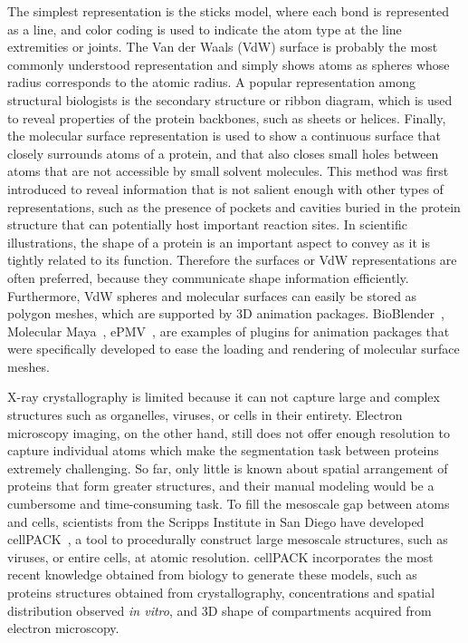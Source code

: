 The simplest representation is the sticks model, where each bond is represented as a line, and color coding is used to indicate the atom type at the line extremities or joints.
The Van der Waals (VdW) surface is probably the most commonly understood representation and simply shows atoms as spheres whose radius corresponds to the atomic radius.
A popular representation among structural biologists is the secondary structure or ribbon diagram, which is used to reveal properties of the protein backbones, such as sheets or helices.
Finally, the molecular surface representation is used to show a continuous surface that closely surrounds atoms of a protein, and that also closes small holes between atoms that are not accessible by small solvent molecules.
This method was first introduced to reveal information that is not salient enough with other types of representations, such as the presence of pockets and cavities buried in the protein structure that can potentially host important reaction sites.
In scientific illustrations, the shape of a protein is an important aspect to convey as it is tightly related to its function.
Therefore the surfaces or VdW representations are often preferred, because they communicate shape information efficiently.
Furthermore, VdW spheres and molecular surfaces can easily be stored as polygon meshes, which are supported by 3D animation packages.
BioBlender~\cite{andrei2012intuitive}, Molecular Maya~\cite{mmaya}, ePMV~\cite{johnson2011epmv}, are examples of plugins for animation packages that were specifically developed to ease the loading and rendering of molecular surface meshes.

X-ray crystallography is limited because it can not capture large and complex structures such as organelles, viruses, or cells in their entirety.
Electron microscopy imaging, on the other hand, still does not offer enough resolution to capture individual atoms which make the segmentation task between proteins extremely challenging.
So far, only little is known about spatial arrangement of proteins that form greater structures, and their manual modeling would be a cumbersome and time-consuming task.
To fill the mesoscale gap between atoms and cells, scientists from the Scripps Institute in San Diego have developed cellPACK~\cite{johnson2015cellpack}, a tool to procedurally construct large mesoscale structures, such as viruses, or entire cells, at atomic resolution.
cellPACK incorporates the most recent knowledge obtained from biology to generate these models, such as proteins structures obtained from crystallography, concentrations and spatial distribution observed \textit{in vitro}, and 3D shape of compartments acquired from electron microscopy.

